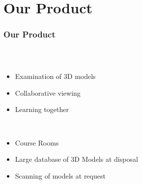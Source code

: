 \section{Our Product}

\begin{frame}
  \frametitle{Our Product}
   \begin{columns}
    \begin{column}{0.8\textwidth}
      \begin{description}[]
        \item[What is it?] \hfill \\
        \begin{itemize}
          \item  Examination of  3D models
          \item Collaborative viewing
          \item Learning together
        \end{itemize}

        \bigskip
        \item[Key features ] \hfill \\
          \begin{itemize}
            \item Course Rooms
            \item Large database of 3D Models at disposal
            \item Scanning of models at request
        \end{itemize}
      \end{description}
    \end{column}


\end{columns}
\end{frame}
